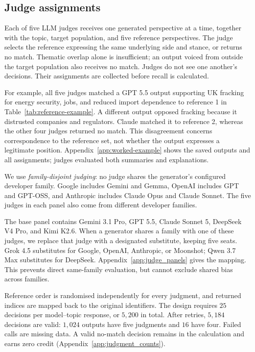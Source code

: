 \documentclass[11pt,a4paper]{article}
\begin{document}
\subsection{Judge assignments}
\label{sec:Judge evaluation}
Each of five LLM judges receives one generated perspective at a time, together with the topic, target population, and five reference perspectives. The judge selects the reference expressing the same underlying side and stance, or returns no match. Thematic overlap alone is insufficient; an output voiced from outside the target population also receives no match. Judges do not see one another's decisions. Their assignments are collected before recall is calculated.

For example, all five judges matched a GPT 5.5 output supporting UK fracking for energy security, jobs, and reduced import dependence to reference 1 in Table~\ref{tab:reference-example}. A different output opposed fracking because it distrusted companies and regulators. Claude matched it to reference 2, whereas the other four judges returned no match. This disagreement concerns correspondence to the reference set, not whether the output expresses a legitimate position. Appendix~\ref{app:worked-example} shows the saved outputs and all assignments; judges evaluated both summaries and explanations.

We use \emph{family-disjoint judging}: no judge shares the generator's configured developer family. Google includes Gemini and Gemma, OpenAI includes GPT and GPT-OSS, and Anthropic includes Claude Opus and Claude Sonnet. The five judges in each panel also come from different developer families.

The base panel contains Gemini 3.1 Pro, GPT 5.5, Claude Sonnet 5, DeepSeek V4 Pro, and Kimi K2.6. When a generator shares a family with one of these judges, we replace that judge with a designated substitute, keeping five seats. Grok 4.5 substitutes for Google, OpenAI, Anthropic, or Moonshot; Qwen 3.7 Max substitutes for DeepSeek. Appendix~\ref{app:judge_panels} gives the mapping. This prevents direct same-family evaluation, but cannot exclude shared bias across families.

Reference order is randomised independently for every judgment, and returned indices are mapped back to the original identifiers. The design requires $25$ decisions per model--topic response, or $5{,}200$ in total. After retries, $5{,}184$ decisions are valid: $1{,}024$ outputs have five judgments and $16$ have four. Failed calls are missing data. A valid no-match decision remains in the calculation and earns zero credit (Appendix~\ref{app:judgment_counts}).
\end{document}
